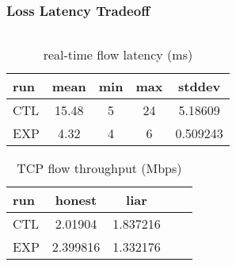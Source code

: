 \documentclass[xcolor=pdftex,dvipsnames,table]{beamer}
\begin{document}
\begin{frame}
\frametitle{Loss Latency Tradeoff}

  \begin{columns}
    \begin{column}{0.6\textwidth}

\begin{center}

\begin{table}
  \begin{tabular}{l | c | c | c | c }
    run & mean & min & max & stddev \\
    \hline \hline
    CTL & 15.48 & 5 & 24 & 5.18609\\ 
    EXP & 4.32 & 4 & 6 & 0.509243\\
  \end{tabular}
  \caption{real-time flow latency (ms)}
\end{table}

\begin{table}
  \begin{tabular}{l | c | c | c | c }
    run & honest & liar \\
    \hline \hline
    CTL & 2.01904 & 1.837216\\ 
    EXP & 2.399816 & 1.332176\\
  \end{tabular}
  \caption{TCP flow throughput (Mbps)}
\end{table}

\end{center}

\end{column}


\begin{column}{0.5\textwidth}
  \begin{center}
    
  \end{center}
\end{column}
\end{columns}
\end{frame}
\end{document}
